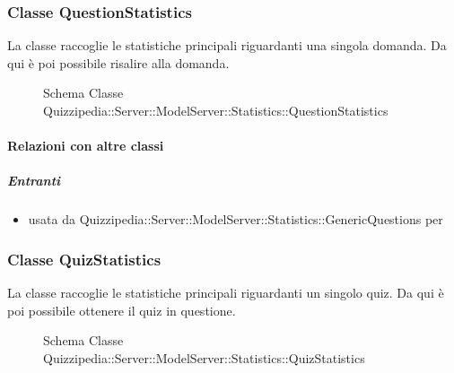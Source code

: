 \subsubsection{Classe QuestionStatistics}
La classe raccoglie le statistiche principali riguardanti una singola domanda. Da qui è poi possibile risalire alla domanda.
\begin{figure}[H]
\centering
\noindent{}
\caption[Schema Classe QuestionStatistics]{Schema Classe Quizzipedia::Server::ModelServer::Statistics::QuestionStatistics}
\end{figure}
\paragraph{Relazioni con altre classi}
\subparagraph{Entranti}
\begin{itemize}
\item usata da Quizzipedia::Server::ModelServer::Statistics::GenericQuestions per 
\end{itemize}
\subsubsection{Classe QuizStatistics}
La classe raccoglie le statistiche principali riguardanti un singolo quiz. Da qui è poi possibile ottenere il quiz in questione.
\begin{figure}[H]
\centering
\noindent{}
\caption[Schema Classe QuizStatistics]{Schema Classe Quizzipedia::Server::ModelServer::Statistics::QuizStatistics}
\end{figure}
